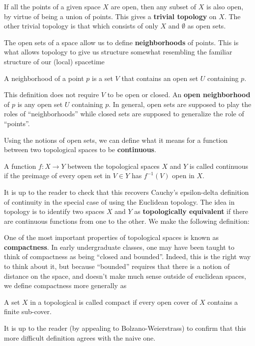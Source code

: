 	\begin{eg}
		If all the points of a given space $X$ are open, then any subset of $X$ is also open, by virtue of being a union of points. This gives a \textbf{trivial topology} on $X$. The other trivial topology is that which consists of only $X$ and $\emptyset$ as open sets.
	\end{eg}
	
	The open sets of a space allow us to define \textbf{neighborhoods} of points. This is what allows topology to give us structure somewhat resembling the familiar structure of our (local) spacetime
	\begin{defn}[Neighborhood]
		A neighborhood of a point $p$ is a set $V$ that contains an open set $U$ containing $p$.
	\end{defn}
	This definition does not require $V$ to be open or closed. An \textbf{open neighborhood} of $p$ is any open set $U$ containing $p$. In general, open sets are supposed to play the roles of ``neighborhoods'' while closed sets are supposed to generalize the role of ``points''.
	
	Using the notions of open sets, we can define what it means for a function between two topological spaces to be \textbf{continuous}.
	\begin{defn}
		A function $f: X \to Y$ between the topological spaces $X$ and $Y$ is called continuous if the preimage of every open set in $V \in Y$ has $f^{-1}(V)$ open in $X$.
	\end{defn}
	It is up to the reader to check that this recovers Cauchy's epsilon-delta definition of continuity in the special case of using the Euclidean topology. The idea in topology is to identify two spaces $X$ and $Y$ as \textbf{topologically equivalent} if there are continuous functions from one to the other. We make the following definition:
	\begin{defn}[Homeomorphism]
		
	\end{defn}
	
	
	
	One of the most important properties of topological spaces is known as \textbf{compactness}. In early undergraduate classes, one may have been taught to think of compactness as being ``closed and bounded''. Indeed, this is the right way to think about it, but because ``bounded'' requires that there is a notion of distance on the space, and doesn't make much sense outside of euclidean spaces, we define compactness more generally as 
	\begin{defn}[Compact]
		A set $X$ in a topological is called compact if every open cover of $X$ contains a finite sub-cover.
	\end{defn}
	It is up to the reader (by appealing to Bolzano-Weierstrass) to confirm that this more difficult definition agrees with the naive one. 
	
